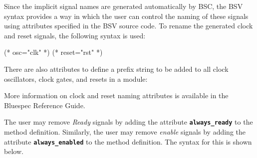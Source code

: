 \documentclass{article}
\newenvironment{centerboxverbatim}
  {\center
   \boxedverbatim}
  {\endboxedverbatim
  {\endcenter }}
\begin{document}
Since the implicit signal names are generated automatically by BSC,
the BSV syntax provides a way in which the user can control
the naming of these signals using attributes specified in the BSV
source code.   To rename the generated clock and reset
signals, the following syntax is used:

\begin{centerboxverbatim}
(* osc="clk" *)
(* reset="rst" *)
\end{centerboxverbatim}

There are also attributes to define  a prefix string to be added to all clock
oscillators, clock gates, and resets in a module:



More information on clock and reset naming attributes is available in
the  Bluespec Reference Guide.





The user may remove \emph{Ready} signals
by adding the attribute {\bf\tt always\_ready}
to the method definition.
Similarly, the user may remove \emph{enable} signals
by adding the attribute {\bf\tt always\_enabled} to the method definition.
The syntax for this is shown below.
\end{document}

